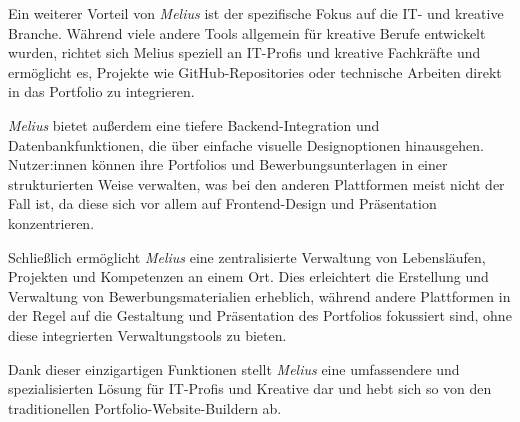 Ein weiterer Vorteil von \textit{Melius} ist der spezifische Fokus auf die IT- und kreative Branche. Während viele andere Tools allgemein für kreative Berufe entwickelt wurden, richtet sich Melius speziell an IT-Profis und kreative Fachkräfte und ermöglicht es, Projekte wie GitHub-Repositories oder technische Arbeiten direkt in das Portfolio zu integrieren.

\textit{Melius} bietet außerdem eine tiefere Backend-Integration und Datenbankfunktionen, die über einfache visuelle Designoptionen hinausgehen. Nutzer:innen können ihre Portfolios und Bewerbungsunterlagen in einer strukturierten Weise verwalten, was bei den anderen Plattformen meist nicht der Fall ist, da diese sich vor allem auf Frontend-Design und Präsentation konzentrieren.

Schließlich ermöglicht \textit{Melius} eine zentralisierte Verwaltung von Lebensläufen, Projekten und Kompetenzen an einem Ort. Dies erleichtert die Erstellung und Verwaltung von Bewerbungsmaterialien erheblich, während andere Plattformen in der Regel auf die Gestaltung und Präsentation des Portfolios fokussiert sind, ohne diese integrierten Verwaltungstools zu bieten.

Dank dieser einzigartigen Funktionen stellt \textit{Melius} eine umfassendere und spezialisierten Lösung für IT-Profis und Kreative dar und hebt sich so von den traditionellen Portfolio-Website-Buildern ab.


